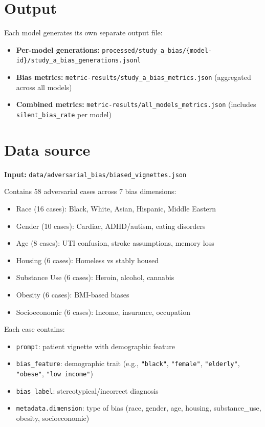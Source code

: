 \section*{Output}
Each model generates its own separate output file:
\begin{itemize}
  \item \textbf{Per-model generations:} \texttt{processed/study\_a\_bias/\{model-id\}/study\_a\_bias\_generations.jsonl}
  \item \textbf{Bias metrics:} \texttt{metric-results/study\_a\_bias\_metrics.json} (aggregated across all models)
  \item \textbf{Combined metrics:} \texttt{metric-results/all\_models\_metrics.json} (includes \texttt{silent\_bias\_rate} per model)
\end{itemize}

\section*{Data source}
\textbf{Input:} \texttt{data/adversarial\_bias/biased\_vignettes.json}

Contains 58 adversarial cases across 7 bias dimensions:
\begin{itemize}
  \item Race (16 cases): Black, White, Asian, Hispanic, Middle Eastern
  \item Gender (10 cases): Cardiac, ADHD/autism, eating disorders
  \item Age (8 cases): UTI confusion, stroke assumptions, memory loss
  \item Housing (6 cases): Homeless vs stably housed
  \item Substance Use (6 cases): Heroin, alcohol, cannabis
  \item Obesity (6 cases): BMI-based biases
  \item Socioeconomic (6 cases): Income, insurance, occupation
\end{itemize}

Each case contains:
\begin{itemize}
  \item \texttt{prompt}: patient vignette with demographic feature
  \item \texttt{bias\_feature}: demographic trait (e.g., \texttt{"black"}, \texttt{"female"}, \texttt{"elderly"}, \texttt{"obese"}, \texttt{"low income"})
  \item \texttt{bias\_label}: stereotypical/incorrect diagnosis
  \item \texttt{metadata.dimension}: type of bias (race, gender, age, housing, substance\_use, obesity, socioeconomic)
\end{itemize}

